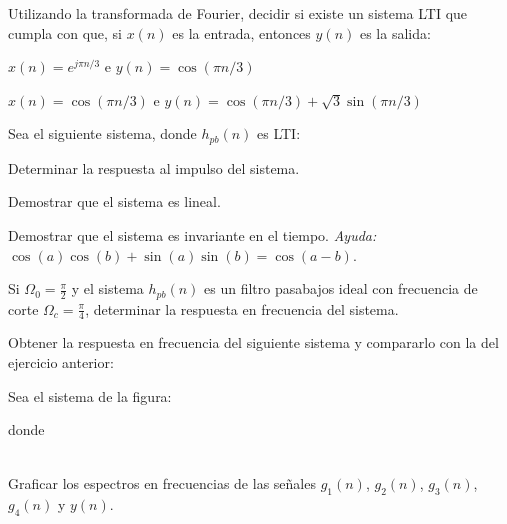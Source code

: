 \begin{ejercicio}
    Utilizando la transformada de Fourier, decidir si existe un sistema LTI que cumpla con que, si $x(n)$ es la entrada, entonces $y(n)$ es la salida:
    
    \inciso $x(n)= e^{j\pi n/3}$ e $y(n) = \cos(\pi n/3)$

    \inciso $x(n) = \cos(\pi n/3)$ e $y(n) = \cos(\pi n/3) + \sqrt{3} \sin(\pi n/3)$
\end{ejercicio}

\begin{ejercicio}
    Sea el siguiente sistema, donde $h_{pb}(n)$ es LTI:
    \begin{center}
    \parbox{.7\textwidth}{}
    \end{center}

    \inciso Determinar la respuesta al impulso del sistema.

    \inciso Demostrar que el sistema es lineal.

    \inciso Demostrar que el sistema es invariante en el tiempo. \emph{Ayuda:} $\cos(a)\cos(b) + \sin(a)\sin(b) = \cos(a-b)$.

    \inciso Si $\Omega_0 = \frac{\pi}{2}$ y el sistema $h_{pb}(n)$ es un filtro pasabajos ideal con frecuencia de corte $\Omega_c = \frac{\pi}{4}$, determinar la respuesta en frecuencia del sistema.
\end{ejercicio}

\begin{ejercicio}
    Obtener la respuesta en frecuencia del siguiente sistema y compararlo con la del ejercicio anterior:
    \begin{center}
    \parbox{.7\textwidth}{}
    \end{center}
\end{ejercicio}

\begin{ejercicio}
    Sea el sistema de la figura:
    \begin{center}
        \parbox{.7\textwidth}{}
    \end{center}
    donde
    \begin{align*}
        \parbox{.4\textwidth}{} &
        \parbox{.4\textwidth}{}
    \end{align*}
    Graficar los espectros en frecuencias de las señales $g_1(n)$, $g_2(n)$, $g_3(n)$, $g_4(n)$ y $y(n)$.
\end{ejercicio}